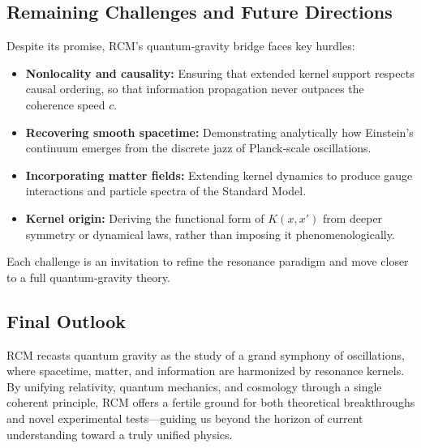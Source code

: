 \subsection{Remaining Challenges and Future Directions}

Despite its promise, RCM’s quantum‐gravity bridge faces key hurdles:
\begin{itemize}
  \item \textbf{Nonlocality and causality:} Ensuring that extended kernel support respects causal ordering, so that information propagation never outpaces the coherence speed \(c\).  
  \item \textbf{Recovering smooth spacetime:} Demonstrating analytically how Einstein’s continuum emerges from the discrete jazz of Planck‐scale oscillations.  
  \item \textbf{Incorporating matter fields:} Extending kernel dynamics to produce gauge interactions and particle spectra of the Standard Model.  
  \item \textbf{Kernel origin:} Deriving the functional form of \(K(x,x')\) from deeper symmetry or dynamical laws, rather than imposing it phenomenologically.
\end{itemize}
Each challenge is an invitation to refine the resonance paradigm and move closer to a full quantum‐gravity theory.

\subsection{Final Outlook}

RCM recasts quantum gravity as the study of a grand symphony of oscillations, where spacetime, matter, and information are harmonized by resonance kernels.  By unifying relativity, quantum mechanics, and cosmology through a single coherent principle, RCM offers a fertile ground for both theoretical breakthroughs and novel experimental tests—guiding us beyond the horizon of current understanding toward a truly unified physics.


